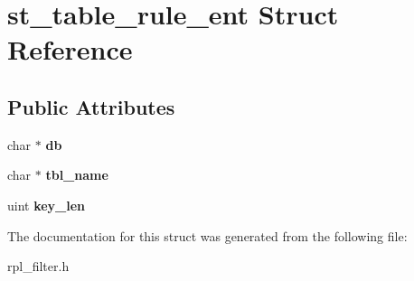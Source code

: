 \hypertarget{structst__table__rule__ent}{}\section{st\+\_\+table\+\_\+rule\+\_\+ent Struct Reference}
\label{structst__table__rule__ent}
\subsection*{Public Attributes}
\begin{DoxyCompactItemize}
\item 
\mbox{\label{structst__table__rule__ent_a69f7862c1bf3ba46378d98d4924f99b4}} 
char $\ast$ {\bfseries db}
\item 
\mbox{\label{structst__table__rule__ent_a750980915242b743d63f0f7868d8c0e1}} 
char $\ast$ {\bfseries tbl\+\_\+name}
\item 
\mbox{\label{structst__table__rule__ent_a5e2aa5956e6f01127587f2ef43bc8215}} 
uint {\bfseries key\+\_\+len}
\end{DoxyCompactItemize}


The documentation for this struct was generated from the following file\+:\begin{DoxyCompactItemize}
\item 
rpl\+\_\+filter.\+h\end{DoxyCompactItemize}
